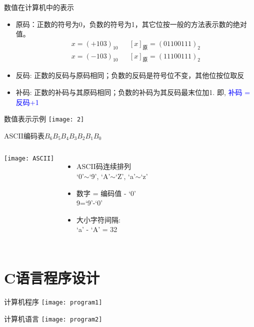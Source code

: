 \begin{frame}{数值在计算机中的表示}
\begin{itemize}
	\item 原码：正数的符号为0，负数的符号为1，其它位按一般的方法表示数的绝对值。
	\begin{align*}
	x=(+103)_{10}  &&[x]_{\text{原}}=(01100111)_{2}\\
	x=(-103)_{10}  &&[x]_{\text{原}}=(11100111)_{2}
	\end{align*}
	\item 反码: 正数的反码与原码相同；负数的反码是符号位不变，其他位按位取反 
	\item 补码: 正数的补码与其原码相同；负数的补码为其反码最末位加1. 即, \textcolor{blue}{补码 = 反码+1}
\end{itemize}
\end{frame}

\begin{frame}{数值表示示例}
\texttt{[image: 2]}
\end{frame}

\begin{frame}{ASCII编码表$B_6B_5B_4B_3B_2B_1B_0$}
\begin{columns}
	\texttt{[image: ASCII]}
	\begin{itemize}
		\item ASCII码连续排列 \\
		 `0'$\sim$`9', `A'$\sim$`Z', `a'$\sim$`z'
		\item 数字 = 编码值 - `0' \\
		 9=`9'-`0'
		\item 大小字符间隔: \\
		`a' - `A' = 32
	\end{itemize}
	
\end{columns}
\end{frame}

\section{C语言程序设计}

\begin{frame}{计算机程序}
\texttt{[image: program1]}
\end{frame}

\begin{frame}{计算机语言}
\texttt{[image: program2]}
\end{frame}

